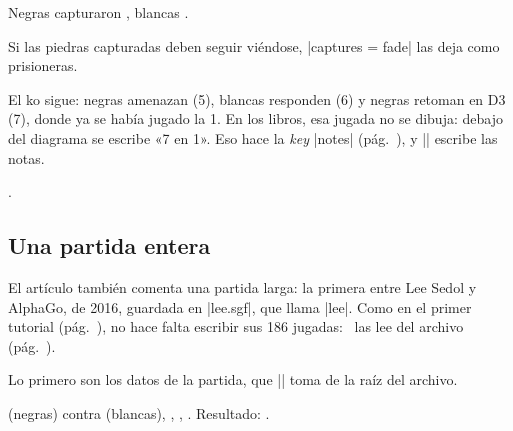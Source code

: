 \begin{goban}
\begin{codeexample}[width=4.8cm]
	Negras capturaron ,
	blancas .
\end{codeexample}

Si las piedras capturadas deben seguir viéndose, |captures = fade| las deja como prisioneras.

\begin{codeexample}[width=4.8cm]
	\begin{goban}[7, captures = fade]
	\end{goban}
\end{codeexample}

El ko sigue: negras amenazan (5), blancas responden (6) y negras retoman en D3 (7), donde ya se había jugado la 1. En los libros, esa jugada no se dibuja: debajo del diagrama se escribe «7 en 1». Eso hace la \emph{key} |notes| (pág.~\pageref{subsec:notas}), y |\pgfgomovenotes| escribe las notas.

\begin{codeexample}[width=4.8cm]
	\begin{goban}
	\end{goban}

	\pgfgomovenotes.
\end{codeexample}

\subsection{Una partida entera}
\label{tut:partida}

El artículo también comenta una partida larga: la primera entre Lee Sedol y AlphaGo, de 2016, guardada en |lee.sgf|, que llama |lee|. Como en el primer tutorial (pág.~\pageref{tut:primera}), no hace falta escribir sus 186 jugadas: \pgfgoname\ las lee del archivo (pág.~\pageref{subsec:sgf}).

Lo primero son los datos de la partida, que |\sgfinfo| toma de la raíz del archivo.

\begin{codeexample}

	 (negras) contra  (blancas),
	, , .
	Resultado: .
\end{codeexample}


\end{goban}
